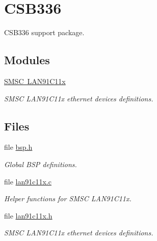 \hypertarget{group__RTEMSBSPsARMCSB336}{}\section{C\+S\+B336}
\label{group__RTEMSBSPsARMCSB336}


C\+S\+B336 support package.  


\subsection*{Modules}
\begin{DoxyCompactItemize}
\item 
\mbox{\hyperlink{group__arm__csb336__lan91c11x}{S\+M\+S\+C L\+A\+N91\+C11x}}
\begin{DoxyCompactList}\small\item\em S\+M\+SC L\+A\+N91\+C11x ethernet devices definitions. \end{DoxyCompactList}\end{DoxyCompactItemize}
\subsection*{Files}
\begin{DoxyCompactItemize}
\item 
file \mbox{\hyperlink{bsps_2arm_2csb336_2include_2bsp_8h}{bsp.\+h}}
\begin{DoxyCompactList}\small\item\em Global B\+SP definitions. \end{DoxyCompactList}\item 
file \mbox{\hyperlink{lan91c11x_8c}{lan91c11x.\+c}}
\begin{DoxyCompactList}\small\item\em Helper functions for S\+M\+SC L\+A\+N91\+C11x. \end{DoxyCompactList}\item 
file \mbox{\hyperlink{lan91c11x_8h}{lan91c11x.\+h}}
\begin{DoxyCompactList}\small\item\em S\+M\+SC L\+A\+N91\+C11x ethernet devices definitions. \end{DoxyCompactList}\end{DoxyCompactItemize}
